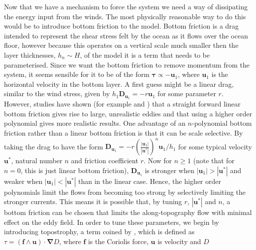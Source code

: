 \documentclass[12pt,a4paper]{report}
\begin{document}
  Now that we have a mechanism to force the system we need a way of dissipating the 
  energy input from the winds. The most physically reasonable way to do this would be to
   introduce bottom friction to the model. Bottom friction is a drag intended to represent 
  the shear stress felt by the ocean as it flows over the ocean floor, however
  because this operates on a vertical scale much smaller then the layer thicknesses, $h_{n} \sim H$, of  the model it is a term that needs to be 
  parameterised. Since we want the bottom friction to remove momentum
  from the system, it seems sensible for it to be of the form $\boldsymbol{\tau} \propto
  - \boldsymbol{u}_{1}$, where $\boldsymbol{u}_{1}$ is the horizontal velocity
  in the bottom layer. A first guess might be a linear drag, similar to the wind stress,
  given by  $h_{1}\boldsymbol{D}_{\boldsymbol{u}_{1}} = - r \boldsymbol{u}_{1}$ for
  some parameter $r$. However, studies have shown (for example \cite{grianik2004effects} and
  \cite{arbic2008quadratic})
  that a straight forward linear
  bottom friction gives rise to large, unrealistic eddies and that using a higher order
  polynomial gives more realistic results.
  One advantage of an $n$-polynomial bottom  friction rather than 
  a linear bottom friction is that it can be scale selective. By taking the 
  drag to have the form $\boldsymbol{D}_{\boldsymbol{u}_{1}} = 
  - r \left( \frac{ \left|\boldsymbol{u}_{1}\right| }
  {\left|\boldsymbol{u}^{\ast}\right|}\right)^{n}
  \boldsymbol{u}_{1}/h_{1}$ for some typical velocity $\boldsymbol{u}^{\ast}$, 
  natural number $n$ and friction coefficient $r$. Now for $n \geq 1$ (note that for $n=0$, this is 
  just linear bottom friction), $\boldsymbol{D}_{\boldsymbol{u}_{1}}$
  is stronger when $\left|\boldsymbol{u}_{1}\right| > \left|\boldsymbol{u}^{\ast}\right|$
  and weaker when $\left|\boldsymbol{u}_{1}\right| < \left|\boldsymbol{u}^{\ast}\right|$
  than in the linear case. Hence, the higher order polynomials limit the flows from 
  becoming too strong by selectively limiting the stronger currents.
  This means it is possible that, by tuning $r$, $\left|\boldsymbol{u}^{\ast}\right|$ and 
  $n$, a bottom friction can be chosen that limits the along-topography flow with
  minimal effect on the eddy field. In order to tune these parameters, we begin by 
  introducing topostrophy, a term coined by \cite{holloway2007water}, which is defined as
  $\tau = \left(\boldsymbol{ f } \wedge
  \boldsymbol{ u } \right) \cdot \boldsymbol{\nabla} D $,
  where $\boldsymbol{f}$ is the Coriolis force, $\boldsymbol{u}$ is velocity and $D$
\end{document}
